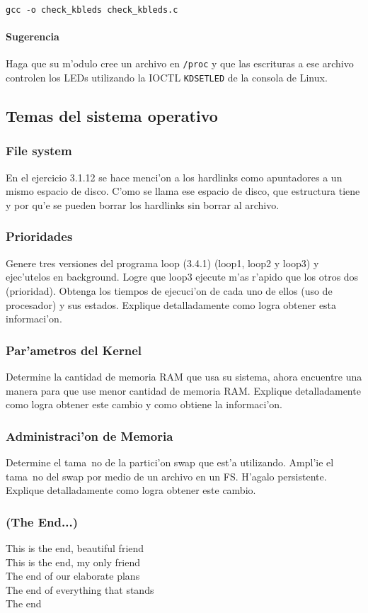 \texttt{gcc -o check\_kbleds check\_kbleds.c}


\paragraph{Sugerencia}

Haga que su m'odulo cree un archivo en \texttt{/proc} y que las escrituras a ese archivo controlen los LEDs utilizando
la IOCTL \texttt{KDSETLED} de la consola de Linux.

\subsection{Temas del sistema operativo}

\subsubsection{File system}
En el ejercicio 3.1.12 se hace menci'on a los hardlinks como
apuntadores a un mismo espacio de disco. C'omo se llama ese espacio
de disco, que estructura tiene y por qu'e se pueden borrar los
hardlinks sin borrar al archivo.\\



\subsubsection{Prioridades}
Genere tres versiones del programa loop (3.4.1) (loop1, loop2 y
loop3) y ejec'utelos en background. Logre que loop3 ejecute m'as
r'apido que los otros dos (prioridad). Obtenga los tiempos de
ejecuci'on de cada uno de ellos (uso de procesador) y sus estados.
Explique detalladamente como logra obtener esta informaci'on.\\



\subsubsection{Par'ametros del Kernel}
Determine la cantidad de memoria RAM que usa su sistema, ahora
encuentre una manera para que use menor cantidad de memoria RAM.
Explique detalladamente como logra obtener este cambio y como
obtiene la informaci'on.

\subsubsection{Administraci'on de Memoria}
Determine el tama~no de la partici'on swap que est'a utilizando.
Ampl'ie el tama~no del swap por medio de un archivo en un FS.
H'agalo persistente. Explique detalladamente como logra obtener este
cambio.

\subsubsection*{(The End...)}

\begin{envRespuesta}
This is the end, beautiful friend\\
This is the end, my only friend\\
The end of our elaborate plans\\
The end of everything that stands\\
The end\\
\end{envRespuesta}
